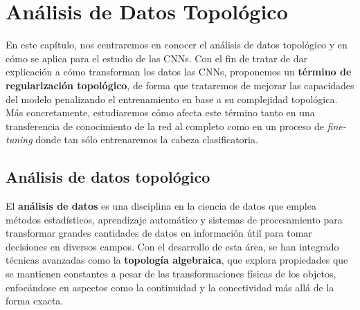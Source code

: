 
\chapter{Análisis de Datos Topológico}
\label{chapter:tda}

En este capítulo, nos centraremos en conocer el análisis de datos topológico y en cómo se aplica para el estudio de las CNNs. Con el fin de tratar de dar explicación a cómo transforman los datos las CNNs, proponemos un \textbf{término de regularización topológico}, de forma que trataremos de mejorar las capacidades del modelo penalizando el entrenamiento en base a su complejidad topológica. Más concretamente, estudiaremos cómo afecta este término tanto en una transferencia de conocimiento de la red al completo como en un proceso de \textit{fine-tuning} donde tan sólo entrenaremos la cabeza clasificatoria.

\section{Análisis de datos topológico}

El \textbf{análisis de datos} es una disciplina en la ciencia de datos que emplea métodos estadísticos, aprendizaje automático y sistemas de procesamiento para transformar grandes cantidades de datos en información útil para tomar decisiones en diversos campos. Con el desarrollo de esta área, se han integrado técnicas avanzadas como la \textbf{topología algebraica}, que explora propiedades que se mantienen constantes a pesar de las transformaciones físicas de los objetos, enfocándose en aspectos como la continuidad y la conectividad más allá de la forma exacta.

